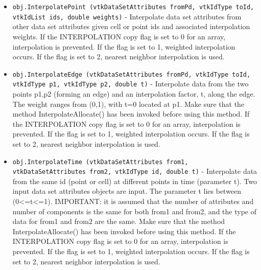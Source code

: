 \begin{itemize}
\item  \verb|obj.InterpolatePoint (vtkDataSetAttributes fromPd, vtkIdType toId, vtkIdList ids, double weights)| -  Interpolate data set attributes from other data set attributes
 given cell or point ids and associated interpolation weights.
 If the INTERPOLATION copy flag is set to 0 for an array, interpolation
 is prevented. If the flag is set to 1, weighted interpolation occurs.
 If the flag is set to 2, nearest neighbor interpolation is used.

\item  \verb|obj.InterpolateEdge (vtkDataSetAttributes fromPd, vtkIdType toId, vtkIdType p1, vtkIdType p2, double t)| -  Interpolate data from the two points p1,p2 (forming an edge) and an 
 interpolation factor, t, along the edge. The weight ranges from (0,1), 
 with t=0 located at p1. Make sure that the method InterpolateAllocate() 
 has been invoked before using this method.
 If the INTERPOLATION copy flag is set to 0 for an array, interpolation
 is prevented. If the flag is set to 1, weighted interpolation occurs.
 If the flag is set to 2, nearest neighbor interpolation is used.

\item  \verb|obj.InterpolateTime (vtkDataSetAttributes from1, vtkDataSetAttributes from2, vtkIdType id, double t)| -  Interpolate data from the same id (point or cell) at different points
 in time (parameter t). Two input data set attributes objects are input.
 The parameter t lies between (0<=t<=1). IMPORTANT: it is assumed that
 the number of attributes and number of components is the same for both
 from1 and from2, and the type of data for from1 and from2 are the same.
 Make sure that the method InterpolateAllocate() has been invoked before 
 using this method.
 If the INTERPOLATION copy flag is set to 0 for an array, interpolation
 is prevented. If the flag is set to 1, weighted interpolation occurs.
 If the flag is set to 2, nearest neighbor interpolation is used.

\end{itemize}
